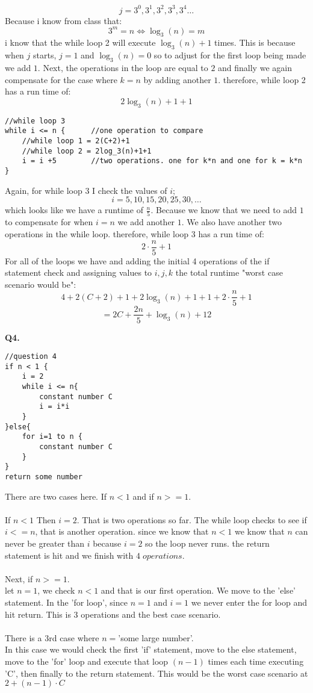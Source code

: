 \documentclass[a4paper,12pt]{article}
\begin{document}
$$j=3^0, 3^1, 3^2, 3^3, 3^4 \dots$$
Because i know from class that:
$$3^m = n \iff \log_3(n)=m$$
i know that the while loop 2 will execute $\log_3(n)+1$ times. This is because when $j$ starts, $j=1$ and $\log_3(n) = 0$ so to adjust for the first loop being made we add $1$. Next, the operations in the loop are equal to $2$ and finally we again compensate for the case where $k=n$ by adding another $1$. therefore, while loop 2 has a run time of:
$$2\log_3(n)+1+1$$ 
\begin{lstlisting}
//while loop 3
while i <= n {		//one operation to compare
	//while loop 1 = 2(C+2)+1
	//while loop 2 = 2log_3(n)+1+1
	i = i +5		//two operations. one for k*n and one for k = k*n
}
\end{lstlisting}
Again, for while loop 3 I check the values of $i$;
$$i = 5, 10, 15, 20, 25, 30, \dots$$
which looks like we have a runtime of $\frac{n}{5}$. Because we know that we need to add $1$ to compensate for when $i=n$ we add another $1$. We also have another two operations in the while loop. therefore, while loop 3 has a run time of:
$$2\cdot\frac{n}{5}+1$$ 
For all of the loops we have and adding the initial 4 operations of the if statement check and assigning values to $i, j, k$ the total runtime "worst case scenario would be":
$$4+2(C+2)+1+2\log_3(n)+1+1+2\cdot\frac{n}{5}+1$$
$$=2C+\frac{2n}{5}+\log_3(n)+12$$

\newpage
\noindent \textbf{Q4.}\\
\begin{lstlisting}
//question 4
if n < 1 {
	i = 2
	while i <= n{
		constant number C
		i = i*i
	}
}else{
	for i=1 to n {
		constant number C
	}
}
return some number
\end{lstlisting}
There are two cases here. If $n < 1$ and if $n >= 1$.\\ 
\\
If $n < 1$ Then $i=2$. That is two operations so far. The while loop checks to see if $i <= n$, that is another operation. since we know that $n < 1$ we know that $n$ can never be greater than $i$ because $i=2$ so the loop never runs. the return statement is hit and we finish with $4\; operations$.\\
\\
Next, if $n >= 1$.\\
let $n=1$, we check $n < 1$ and that is our first operation. We move to the 'else' statement. In the 'for loop', since $n=1$ and $i=1$ we never enter the for loop and hit return. This is 3 operations and the best case scenario.\\
\\
There is a 3rd case where $n=$'some large number'.\\
In this case we would check the first 'if' statement, move to the else statement, move to the 'for' loop and execute that loop $(n-1)$ times each time executing 'C', then finally to the return statement. This would be the worst case scenario at $2+ (n-1)\cdot C$
\end{document}
